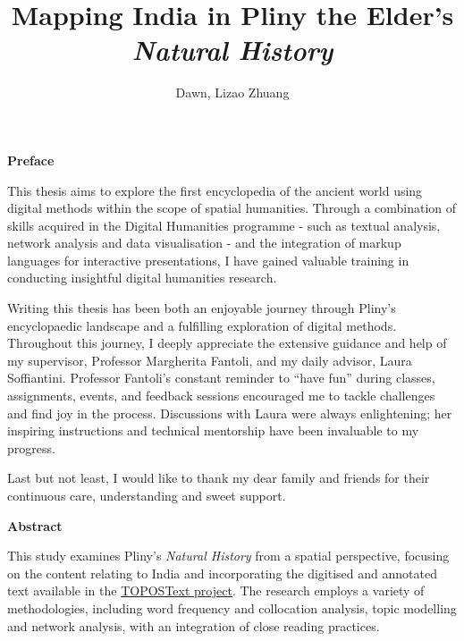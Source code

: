 \documentclass[
  12pt,
]{article}
\title{Mapping India in Pliny the Elder's \emph{Natural History}}
\author{Dawn, Lizao Zhuang}
\date{}
\begin{document}
\maketitle
\thispagestyle{empty}

\newpage

\setlength{\parskip}{12pt}

\raggedright

\Large\textbf{Preface}   

\vspace*{\baselineskip}
\normalsize
\justifying
This thesis aims to explore the first encyclopedia of the ancient world using digital methods within the scope of spatial humanities. Through a combination of skills acquired in the Digital Humanities programme - such as textual analysis, network analysis and data visualisation - and the integration of markup languages for interactive presentations, I have gained valuable training in conducting insightful digital humanities research.

Writing this thesis has been both an enjoyable journey through Pliny's encyclopaedic landscape and a fulfilling exploration of digital methods. Throughout this journey, I deeply appreciate the extensive guidance and help of my supervisor, Professor Margherita Fantoli, and my daily advisor, Laura Soffiantini. Professor Fantoli's constant reminder to ``have fun'' during classes, assignments, events, and feedback sessions encouraged me to tackle challenges and find joy in the process. Discussions with Laura were always enlightening; her inspiring instructions and technical mentorship have been invaluable to my progress.

Last but not least, I would like to thank my dear family and friends for their continuous care, understanding and sweet support.

\newpage



\raggedright

\Large\textbf{Abstract}   

\vspace*{\baselineskip}
\normalsize
\justifying
This study examines Pliny's \textit{Natural History} from a spatial perspective, focusing on the content relating to India and incorporating the digitised and annotated text available in the \href{https://topostext.org/}{TOPOSText project}. The research employs a variety of methodologies, including word frequency and collocation analysis, topic modelling and network analysis, with an integration of close reading practices.
      
\end{document}

